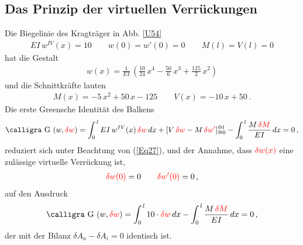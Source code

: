 {{{{%
{\textcolor{sectionTitleBlue}{\subsection{Das Prinzip der virtuellen Verr\"{u}ckungen}}}
Die Biegelinie des Kragtr\"{a}ger in Abb. \ref{U54}
\begin{align} \label{Eq27}
EI\,w^{IV}(x) = 10 \qquad w(0) = w'(0) = 0 \qquad M(l) = V(l) = 0
\end{align}
hat die Gestalt
\begin{align}
w(x) = \frac{1}{EI}\,(\frac{10}{24}\,x^4 - \frac{50}{6}\,x^3 + \frac{125}{2} \,x^2 )
\end{align}
und die Schnittkr\"{a}fte lauten
\begin{align}
M(x) = -5\,x^2 + 50\,x - 125 \qquad V(x) = -10\,x + 50\,.
\end{align}
Die erste Greensche Identit\"{a}t des Balkens
\begin{align}
\text{\normalfont\calligra G\,\,}(w,\textcolor{red}{ \delta w})  = \int_0^{\,l} EI\,w^{IV}(x)\,\textcolor{red}{\delta w}\,dx + [V\,\textcolor{red}{\delta w} - M\,\textcolor{red}{\delta w'}]_{@0}^{@l} - \int_0^{\,l} \frac{M\,\textcolor{red}{\delta M}}{EI}\,dx = 0\,,
\end{align}
reduziert sich unter Beachtung von (\ref{Eq27}), und der Annahme, dass $\textcolor{red}{\delta w(x)}$ eine zul\"{a}ssige virtuelle Verr\"{u}ckung ist,
\begin{align}\label{Eq28}
\textcolor{red}{\delta w(0)} = 0 \qquad \textcolor{red}{\delta w'(0)} = 0\,,
\end{align}
auf den Ausdruck
\begin{align}
\text{\normalfont\calligra G\,\,}(w, \textcolor{red}{\delta w})  = \int_0^{\,l} 10 \cdot \textcolor{red}{\delta w}\,dx - \int_0^{\,l} \frac{M\,\textcolor{red}{\delta M}}{EI}\,dx = 0\,,
\end{align}
der mit der Bilanz $\delta A_a - \delta A_i = 0$ identisch ist.

}}}}
